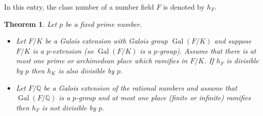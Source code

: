 \documentclass[12pt]{article}
\newtheorem{thm}{Theorem}
\newcommand{\Rats}{\mathbb{Q}}
\newcommand{\Gal}{\operatorname{Gal}}
\begin{document}
In this entry, the class number of a number field $F$ is denoted by $h_F$.

\begin{thm}Let $p$ be a fixed prime number.
\begin{itemize}
\item Let $F/K$ be a Galois extension with Galois group $\Gal(F/K)$ and suppose $F/K$ is a $p$-extension (so $\Gal(F/K)$ is a $p$-group). Assume that there is at most one prime or archimedean place which ramifies in $F/K$. If $h_F$ is divisible by $p$ then $h_K$ is also divisible by $p$.\\
\item Let $F/\Rats$ be a Galois extension of the rational numbers and assume that $\Gal(F/\Rats)$ is a $p$-group and at most one place (finite or infinite) ramifies then $h_F$ is not divisible by $p$.
\end{itemize}
\end{thm}
\end{document}
